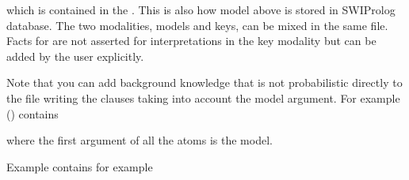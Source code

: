 \documentclass[letterpaper,10pt,english]{sphinxmanual}
\begin{document}
\sphinxAtStartPar
which is contained in the .
This is also how model  above is stored in SWI\sphinxhyphen{}Prolog database.
The two modalities, models and keys, can be mixed in the same file.
Facts for  are not asserted for interpretations in the key modality but can be added by the user explicitly.

\sphinxAtStartPar
Note that you can add background knowledge that is not probabilistic directly to the file writing the clauses taking into account the model argument.
For example () contains

\begin{sphinxVerbatim}[commandchars=\\\{\}]
          
         

 
 
\end{sphinxVerbatim}

\sphinxAtStartPar
where the first argument of all the atoms is the model.

\sphinxAtStartPar
Example  contains for example

\begin{sphinxVerbatim}[commandchars=\\\{\}]
   
\end{sphinxVerbatim}
\end{document}
